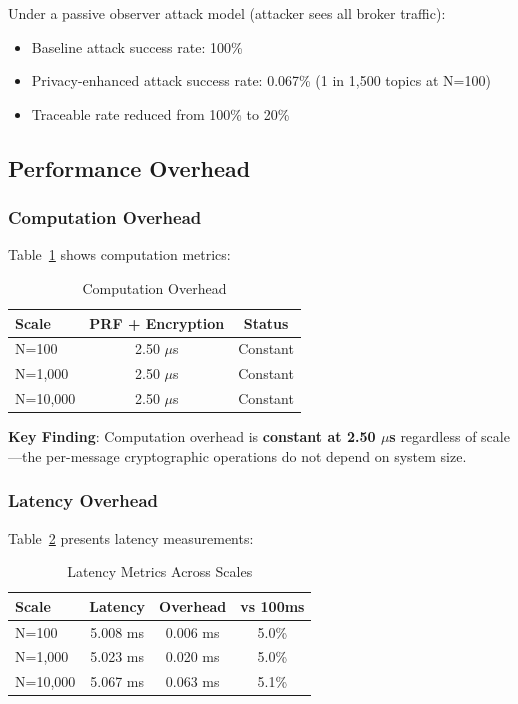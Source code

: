 \documentclass[conference]{IEEEtran}
\begin{document}
Under a passive observer attack model (attacker sees all broker traffic):
\begin{itemize}
    \item Baseline attack success rate: 100\%
    \item Privacy-enhanced attack success rate: 0.067\% (1 in 1,500 topics at N=100)
    \item Traceable rate reduced from 100\% to 20\%
\end{itemize}

\subsection{Performance Overhead}

\subsubsection{Computation Overhead}

Table~\ref{tab:computation} shows computation metrics:

\begin{table}[htbp]
\caption{Computation Overhead}
\label{tab:computation}
\centering
\begin{tabular}{lcc}
\toprule
\textbf{Scale} & \textbf{PRF + Encryption} & \textbf{Status} \\
\midrule
N=100 & 2.50 $\mu$s & Constant \\
N=1,000 & 2.50 $\mu$s & Constant \\
N=10,000 & 2.50 $\mu$s & Constant \\
\bottomrule
\end{tabular}
\end{table}

\textbf{Key Finding}: Computation overhead is \textbf{constant at 2.50 $\mu$s} regardless of scale---the per-message cryptographic operations do not depend on system size.

\subsubsection{Latency Overhead}

Table~\ref{tab:latency} presents latency measurements:

\begin{table}[htbp]
\caption{Latency Metrics Across Scales}
\label{tab:latency}
\centering
\begin{tabular}{lccc}
\toprule
\textbf{Scale} & \textbf{Latency} & \textbf{Overhead} & \textbf{vs 100ms} \\
\midrule
N=100 & 5.008 ms & 0.006 ms & 5.0\% \\
N=1,000 & 5.023 ms & 0.020 ms & 5.0\% \\
N=10,000 & 5.067 ms & 0.063 ms & 5.1\% \\
\bottomrule
\end{tabular}
\end{table}
\end{document}
